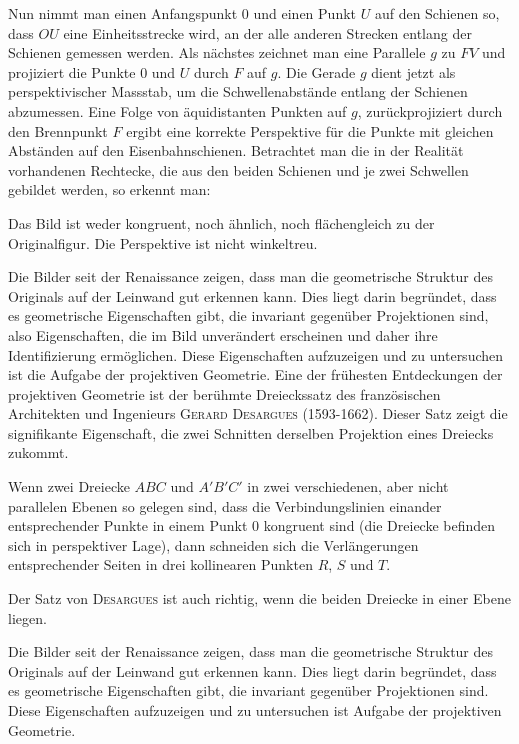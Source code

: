\documentclass[%
11pt,%
twoside,%
titlepage,%
german,%
headsepline%
]{scrartcl}
\begin{document}
Nun nimmt man einen Anfangspunkt $0$ und einen Punkt $U$ auf den Schienen so, dass $OU$ eine Einheitsstrecke wird, an der alle anderen Strecken entlang der Schienen gemessen werden. Als n\"achstes zeichnet man eine Parallele $g$ zu $FV$ und projiziert die Punkte $0$ und $U$ durch $F$ auf $g$. Die Gerade $g$ dient jetzt als perspektivischer Massstab, um die Schwellenabst\"ande entlang der Schienen abzumessen. Eine Folge von \"aquidistanten Punkten auf $g$, zur\"uckprojiziert durch den Brennpunkt $F$ ergibt eine korrekte Perspektive f\"ur die Punkte mit gleichen Abst\"anden auf den Eisenbahnschienen.
Betrachtet man die in der Realit\"at vorhandenen Rechtecke, die aus den beiden Schienen und je zwei Schwellen gebildet werden, so erkennt man:

Das Bild ist weder kongruent, noch \"ahnlich, noch fl\"achengleich zu der Originalfigur.
Die Perspektive ist nicht winkeltreu.

Die Bilder seit der Renaissance zeigen, dass man die geometrische Struktur des Originals auf der Leinwand gut erkennen kann. Dies liegt darin begr\"undet, dass es geometrische Eigenschaften gibt, die invariant gegen\"uber Projektionen sind, also Eigenschaften, die im Bild unver\"andert erscheinen und daher ihre Identifizierung erm\"oglichen. Diese Eigenschaften aufzuzeigen und zu untersuchen ist die Aufgabe der projektiven Geometrie. Eine der fr\"uhesten Entdeckungen der projektiven Geometrie ist der ber\"uhmte Dreieckssatz des franz\"osischen Architekten und Ingenieurs \textsc{Gerard Desargues} (1593-1662). Dieser Satz zeigt die signifikante Eigenschaft, die zwei Schnitten derselben Projektion eines Dreiecks zukommt.

Wenn zwei Dreiecke $ABC$ und $A'B'C'$ in zwei verschiedenen, aber nicht parallelen Ebenen so gelegen sind, dass die Verbindungslinien einander entsprechender Punkte in einem Punkt $0$ kongruent sind (die Dreiecke befinden sich in perspektiver Lage), dann schneiden sich die Verl\"angerungen entsprechender Seiten in drei kollinearen Punkten $R$, $S$ und $T$.

Der Satz von \textsc{Desargues} ist auch richtig, wenn die beiden Dreiecke in einer Ebene liegen.

Die Bilder seit der Renaissance zeigen, dass man die geometrische Struktur des Originals auf der Leinwand gut erkennen kann. Dies liegt darin begr\"undet, dass es geometrische Eigenschaften gibt, die invariant gegen\"uber Projektionen sind. Diese Eigenschaften aufzuzeigen und zu untersuchen ist Aufgabe der projektiven Geometrie.
\end{document}
